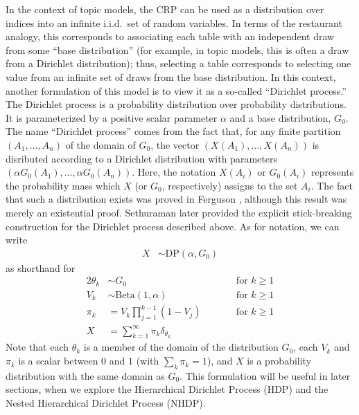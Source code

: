 \documentclass{article}
\begin{document}
In the context of topic models, the CRP can be used as a distribution over indices into an infinite i.i.d.\ set of random variables.
In terms of the restaurant analogy, this corresponds to associating each table with an independent draw from some ``base distribution'' (for example, in topic models, this is often a draw from a Dirichlet distribution); thus, selecting a table corresponds to selecting one value from an infinite set of draws from the base distribution.
In this context, another formulation of this model is to view it as a so-called ``Dirichlet process.''
The Dirichlet process is a probability distribution over probability distributions.
It is parameterized by a positive scalar parameter $\alpha$ and a base distribution, $G_0$.
The name ``Dirichlet process'' comes from the fact that, for any finite partition $(A_1, \ldots, A_n)$ of the domain of $G_0$, the vector $(X(A_1), \ldots, X(A_n))$ is disributed according to a Dirichlet distribution with parameters $(\alpha G_0(A_1), \ldots, \alpha G_0(A_n))$.
Here, the notation $X(A_i)$ or $G_0(A_i)$ represents the probability mass which $X$ (or $G_0$, respectively) assigns to the set $A_i$.
The fact that such a distribution exists was proved in Ferguson \cite{ferguson1973bayesian}, although this result was merely an existential proof.
Sethuraman \cite{sethuraman1994constructive} later provided the explicit stick-breaking construction for the Dirichlet process described above.
As for notation, we can write
\begin{align*}
X &\sim \text{DP}(\alpha, G_0)
\end{align*}
as shorthand for
\begin{alignat*}{2}
\theta_k &\sim G_0 &\qquad& \text{for $k \geq 1$} \\
V_k &\sim \text{Beta}(1, \alpha) &\qquad& \text{for $k \geq 1$} \\
\pi_k &= V_k \prod_{j=1}^{k-1} (1 - V_j) &\qquad& \text{for $k \geq 1$} \\
X &= \sum_{k=1}^\infty \pi_k \delta_{\theta_k} &&
\end{alignat*}
Note that each $\theta_k$ is a member of the domain of the distribution $G_0$, each $V_k$ and $\pi_k$ is a scalar between $0$ and $1$ (with $\sum_k \pi_k = 1$), and $X$ is a probability distribution with the same domain as $G_0$.
This formulation will be useful in later sections, when we explore the Hierarchical Dirichlet Process (HDP) and the Nested Hierarchical Dirichlet Process (NHDP).
\end{document}
